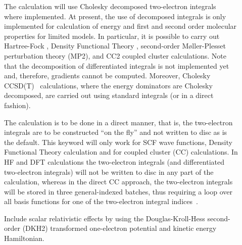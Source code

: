 \begin{description}

\item[] The calculation will use Cholesky decomposed two-electron
integrals~\cite{choint} where implemented.
At present, the use of decomposed integrals is only implemented for calculation of energy and
first and second order molecular properties for limited models.
In particular, it is possible to carry out Hartree-Fock
,
Density Functional Theory
, 
second-order M{\o}ller-Plesset perturbation theory
(MP2), and 
CC2 coupled cluster calculations. Note that
the decomposition of differentiated integrals is not implemented yet and, therefore,
gradients cannot be computed. Moreover, Cholesky CCSD(T)~ 
calculations, where the energy dominators are Cholesky decomposed,
are carried out using standard integrals (or in a direct fashion).


\item[] The calculation is to be done in a direct
manner, that
is, the two-electron integrals are to be
constructed ``on the fly''
and not written to disc as is the default. This keyword will only work
for SCF wave functions,
Density Functional Theory
calculation and for
coupled cluster (CC) calculations. In
HF and DFT calculations the
two-electron integrals (and differentiated
two-electron integrals) will not be written to disc in any part of the
calculation, whereas in the direct CC approach, the two-electron
integrals will be stored in three general-indexed batches, thus
requiring a loop over all basis functions for one of the two-electron
integral indices~\cite{directCC}.

\item[] Include scalar relativistic effects by using the
Douglas-Kroll-Hess second-order (DKH2) transformed one-electron potential and kinetic energy Hamiltonian.



\end{description}
